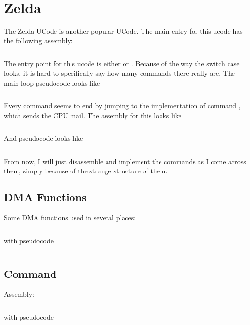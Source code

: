 \chapter{Zelda}

The Zelda UCode is another popular UCode. The main entry for this ucode has the following assembly:

\inputminted[fontsize=\small]{asm}{../zelda/main_loop.asm}

The entry point for this ucode is either  or . Because of the way the switch case looks, it is hard to specifically say how many commands there really are. The main loop pseudocode looks like 

\inputminted[]{c}{../zelda/main_loop.c}

Every command seems to end by jumping to the implementation of command , which sends the CPU mail. The assembly for this looks like 

\inputminted[fontsize=\small]{asm}{../zelda/command_0.asm}

And pseudocode looks like

\inputminted[]{c}{../zelda/command_0.c}

From now, I will just disassemble and implement the commands as I come across them, simply because of the strange structure of them.


\section{DMA Functions}
Some DMA functions used in several places:

\inputminted[fontsize=\small]{asm}{../zelda/dma_funcs.asm}

with pseudocode

\inputminted[fontsize=\small]{asm}{../zelda/dma_funcs.c}

\section{Command }

Assembly:

\inputminted[fontsize=\small]{asm}{../zelda/command_1.asm}

with pseudocode

\inputminted[fontsize=\small]{asm}{../zelda/command_1.c}